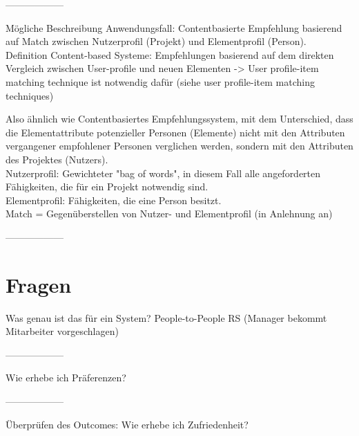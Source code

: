 ------------------

Mögliche Beschreibung Anwendungsfall: %
Contentbasierte Empfehlung basierend auf Match zwischen Nutzerprofil (Projekt) und Elementprofil (Person).\\
Definition Content-based Systeme: Empfehlungen basierend auf dem direkten Vergleich zwischen User-profile und neuen Elementen -> User profile-item matching technique ist notwendig dafür (siehe user profile-item matching techniques) %

Also ähnlich wie Contentbasiertes Empfehlungssystem, mit dem Unterschied, dass die Elementattribute potenzieller Personen (Elemente) nicht mit den Attributen vergangener empfohlener Personen verglichen werden, sondern mit den Attributen des Projektes (Nutzers).\\
Nutzerprofil: Gewichteter "bag of words", in diesem Fall alle angeforderten Fähigkeiten, die für ein Projekt notwendig sind.\\
Elementprofil: Fähigkeiten, die eine Person besitzt.\\
Match = Gegenüberstellen von  Nutzer- und Elementprofil (in Anlehnung an) %

------------------

\newpage

\section{Fragen}
\label{ch:notizen:fragen}

Was genau ist das für ein System? People-to-People RS (Manager bekommt Mitarbeiter vorgeschlagen)

------------------

Wie erhebe ich Präferenzen? %

------------------

Überprüfen des Outcomes:
Wie erhebe ich Zufriedenheit? %

